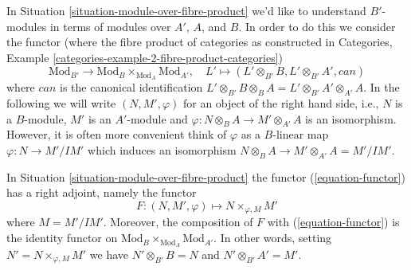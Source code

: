 \noindent
In Situation \ref{situation-module-over-fibre-product}
we'd like to understand $B'$-modules in terms of modules over $A'$, $A$,
and $B$. In order to do this we consider the functor (where the
fibre product of categories as constructed in
Categories, Example \ref{categories-example-2-fibre-product-categories})
\begin{equation}
\label{equation-functor}
\text{Mod}_{B'} \longrightarrow
\text{Mod}_B \times_{\text{Mod}_A} \text{Mod}_{A'},\quad
L' \longmapsto (L' \otimes_{B'} B, L' \otimes_{B'} A', can)
\end{equation}
where $can$ is the canonical identification
$L' \otimes_{B'} B \otimes_B A = L' \otimes_{B'} A' \otimes_{A'} A$.
In the following we will write $(N, M', \varphi)$ for an object
of the right hand side, i.e., $N$ is a $B$-module, $M'$ is an $A'$-module
and $\varphi : N \otimes_B A \to M' \otimes_{A'} A$ is an isomorphism.
However, it is often more convenient think of $\varphi$ as a $B$-linear
map $\varphi : N \to M'/IM'$ which induces an isomorphism
$N \otimes_B A \to M' \otimes_{A'} A = M'/IM'$.

\begin{lemma}
\label{lemma-module-over-fibre-product}
In Situation \ref{situation-module-over-fibre-product}
the functor (\ref{equation-functor}) has a right adjoint, namely
the functor
$$
F : (N, M', \varphi) \longmapsto N \times_{\varphi, M} M'
$$
where $M = M'/IM'$. Moreover, the composition of $F$ with
(\ref{equation-functor}) is the identity functor on
$\text{Mod}_B \times_{\text{Mod}_A} \text{Mod}_{A'}$. In other words,
setting $N' = N \times_{\varphi, M} M'$ we have
$N' \otimes_{B'} B = N$ and $N' \otimes_{B'} A' = M'$.
\end{lemma}

